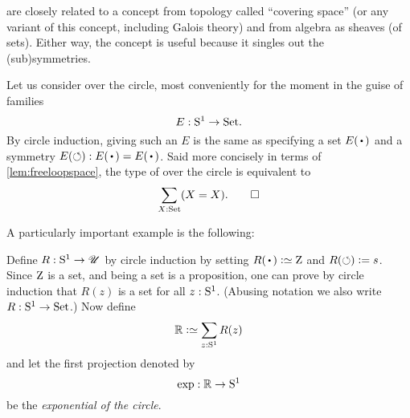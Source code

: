 \begin{remark}
  \Coverings are closely related to a concept from topology called ``covering space'' 
(or any variant of this concept, including Galois theory) and from algebra as sheaves (of sets).  
Either way, the concept is useful because it singles out the (sub)symmetries.  
\end{remark}

\begin{example}\label{xca:coveringsofS1}
Let us consider \coverings over the circle, most conveniently 
for the moment in the guise of families 
\[
  E:{\mathrm{S}^1}\to\mathrm{Set}.
\]
By circle induction, giving such an $E$ is the same as 
specifying a set $E(\base)$ and a symmetry $E(\Sloop):E(\base)=E(\base)$.  
Said more concisely in terms of \cref{lem:freeloopspace},
the type of \coverings over the circle is equivalent to 
\[
  \sum_{X:\mathrm{Set}}(X=X).\qedhere
\]
\end{example}
A particularly important example is the following:
\begin{definition}\label{def:RtoS1}
Define $R:{\mathrm{S}^1}\to{\mathscr{U}}$ by circle induction by setting 
$R(\base)\defeq\zet$ and $R(\circlearrowleft)\mathrel{\vcentcolon=} {s}$.
Since $\mathrm{Z}$ is a set, and being a set is a proposition,
one can prove by circle induction that $R(z)$ is a set for all $z:{\mathrm{S}^1}$.
(Abusing notation we also write $R:{\mathrm{S}^1}\to\mathrm{Set}$.) Now define
\[
  \RR\defeq\sum_{z:\Sc}R(z)
\]
and let the first projection denoted by
\[
  \exp:\mathbb{R}\to {\mathrm{S}^1}
\]
be the \emph{exponential \covering of the circle}.
\end{definition}


